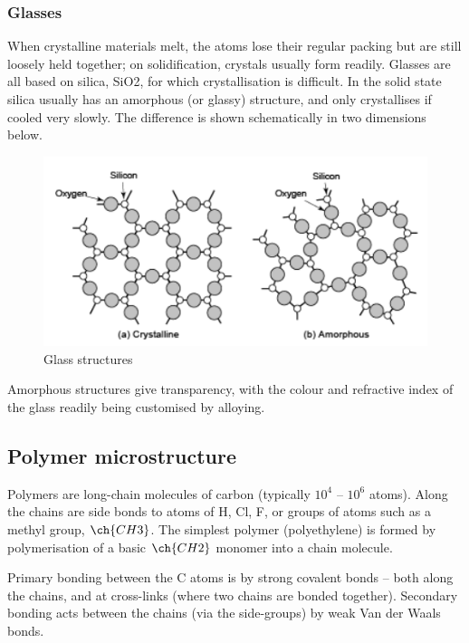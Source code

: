 \documentclass{article}
\begin{document}
\subsubsection{Glasses}

When crystalline materials melt, the atoms lose their regular packing but are still loosely held together; on solidification, crystals usually form readily. Glasses are all based on silica, SiO2, for which crystallisation is difficult. In the solid state silica usually has an amorphous (or glassy) structure, and only crystallises if cooled very slowly. The difference is shown schematically in two dimensions below.

\begin{figure}[h]
    \centering
    \includegraphics{images/mat12.png}
    \caption{Glass structures}
    \label{fig:enter-label}
\end{figure}

Amorphous structures give transparency, with the colour and refractive index of the glass readily
being customised by alloying.

\newpage

\subsection{Polymer microstructure}

Polymers are long-chain molecules of carbon (typically $10^4$ – $10^6$ atoms). Along the chains are side bonds to atoms of H, Cl, F, or groups of atoms such as a methyl group, $\ch{CH3}$. The simplest polymer (polyethylene) is formed by polymerisation of a basic $\ch{CH2}$ monomer into a chain molecule.

Primary bonding between the C atoms is by strong covalent bonds – both along the chains, and at cross-links (where two chains are bonded together). Secondary bonding acts between the chains (via the side-groups) by weak Van der Waals bonds.
\end{document}
